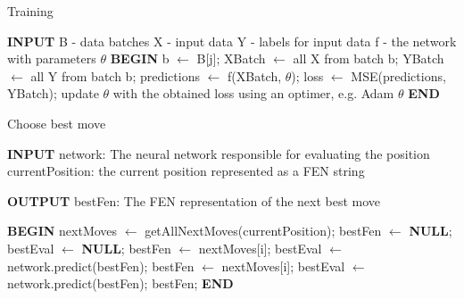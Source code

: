 \documentclass[runningheads,a4paper,11pt]{report}
\begin{document}
\begin{algorithm}
	\caption{Training}
	\label{BestMove}
		\begin{algorithmic}
        
        \STATE \textbf{INPUT}
        \STATE B - data batches
        \STATE X - input data
        \STATE Y - labels for input data
        \STATE f - the network with parameters $\theta$
        \STATE \textbf{BEGIN}
                \STATE b $\leftarrow$ B[j];
                \STATE XBatch $\leftarrow$ all X from batch b;
                \STATE YBatch $\leftarrow$ all Y from batch b;
                \STATE predictions $\leftarrow$ f(XBatch, $\theta$);
                \STATE loss $\leftarrow$ MSE(predictions, YBatch);
                \STATE update $\theta$ with the obtained loss using an optimer, e.g. Adam
            \ENDFOR
        \ENDFOR
        \RETURN $\theta$
  		\STATE \textbf{END}
\end{algorithmic}
\end{algorithm}


\begin{algorithm}
	\caption{Choose best move}
	\label{BestMove}
		\begin{algorithmic}
        
        \STATE \textbf{INPUT}
        \STATE  network: The neural network responsible for evaluating the                       position
        \STATE currentPosition: the current position represented as a FEN string
        
        \STATE \textbf{OUTPUT}
        \STATE  bestFen: The FEN representation of the next best move 
        
		\STATE \textbf{BEGIN}
  		\STATE nextMoves $\leftarrow$ getAllNextMoves(currentPosition);
  		\STATE bestFen $\leftarrow$ \textbf{NULL};
  		\STATE bestEval $\leftarrow$ \textbf{NULL};
  		        \STATE bestFen $\leftarrow$ nextMoves[i];
  		        \STATE bestEval $\leftarrow$ network.predict(bestFen);
  		        \STATE bestFen $\leftarrow$ nextMoves[i];
  		        \STATE bestEval $\leftarrow$ network.predict(bestFen);
  		    \ENDIF
  		\ENDFOR
  		\RETURN bestFen;
  		\STATE \textbf{END}
\end{algorithmic}
\end{algorithm}
\end{document}
